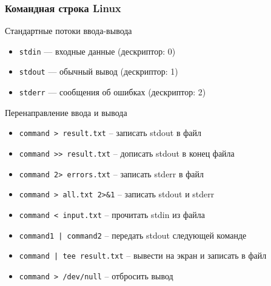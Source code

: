 \documentclass[aspectratio=169]{beamer}
\newcommand{\cmd}[1]{\texttt{#1}}
\begin{document}
\begin{frame}[fragile]
\frametitle{Командная строка Linux}
\begin{block}{Стандартные потоки ввода-вывода}
\begin{itemize}
	\small
	\item \texttt{stdin} — входные данные (дескриптор: 0)
	\item \texttt{stdout} — обычный вывод (дескриптор: 1)
	\item \texttt{stderr} — сообщения об ошибках (дескриптор: 2)
\end{itemize}
\end{block}
\begin{block}{Перенаправление ввода и вывода}
\begin{itemize}
	\small
	\item \cmd{command > result.txt} -- записать stdout в файл
	\item \cmd{command >> result.txt} -- дописать stdout в конец файла
	\item \cmd{command 2> errors.txt} -- записать stderr в файл
	\item \cmd{command > all.txt 2>\&1} -- записать stdout и stderr
	\item \cmd{command < input.txt} -- прочитать stdin из файла
	\item \cmd{command1 | command2} -- передать stdout следующей команде
	\item \cmd{command | tee result.txt} -- вывести на экран и записать в файл
	\item \cmd{command > /dev/null} -- отбросить вывод
\end{itemize}
\end{block}
\vfill
\end{frame}
\end{document}
